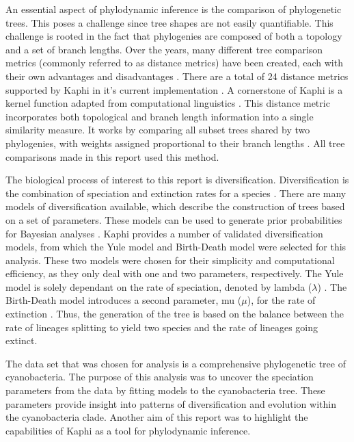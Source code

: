 \documentclass[12pt]{article}
\begin{document}
	An essential aspect of phylodynamic inference is the comparison of phylogenetic trees. This poses a challenge since tree shapes are not easily quantifiable. This challenge is rooted in the fact that phylogenies are composed of both a topology and a set of branch lengths. Over the years, many different tree comparison metrics (commonly referred to as distance metrics) have been created, each with their own advantages and disadvantages \cite{kuhner2014practical}. There are a total of 24 distance metrics supported by Kaphi in it’s current implementation \cite{poon2017kaphi}. A cornerstone of Kaphi is a kernel function adapted from computational linguistics \cite{poon2013mapping}. This distance metric incorporates both topological and branch length information into a single similarity measure. It works by comparing all subset trees shared by two phylogenies, with weights assigned proportional to their branch lengths \cite{poon2013mapping}. All tree comparisons made in this report used this method.

	The biological process of interest to this report is diversification. Diversification is the combination of speciation and extinction rates for a species \cite{tamma2015higher}. There are many models of diversification available, which describe the construction of trees based on a set of parameters. These models can be used to generate prior probabilities for Bayesian analyses \cite{steel2001properties}. Kaphi provides a number of validated diversification models, from which the Yule model and Birth-Death model were selected for this analysis. These two models were chosen for their simplicity and computational efficiency, as they only deal with one and two parameters, respectively. The Yule model is solely dependant on the rate of speciation, denoted by lambda ($\lambda$) \cite{yule1925mathematical}. The Birth-Death model introduces a second parameter, mu ($\mu$), for the rate of extinction \cite{gernhard2008conditioned}. Thus, the generation of the tree is based on the balance between the rate of lineages splitting to yield two species and the rate of lineages going extinct.

	The data set that was chosen for analysis is a comprehensive phylogenetic tree of cyanobacteria. The purpose of this analysis was to uncover the speciation parameters from the data by fitting models to the cyanobacteria tree. These parameters provide insight into patterns of diversification and evolution within the cyanobacteria clade. Another aim of this report was to highlight the capabilities of Kaphi as a tool for phylodynamic inference.
\end{document}
